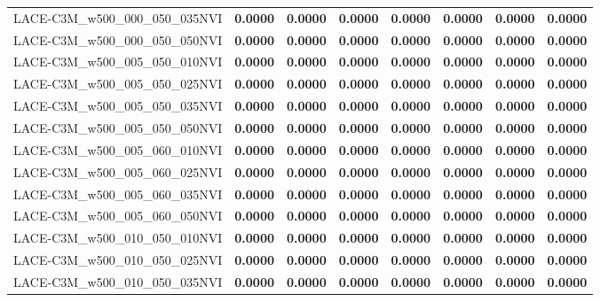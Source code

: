 \begin{table}
\begin{tabular}{lrrrrrrr}
LACE-C3M\_w500\_000\_050\_035NVI & \textbf{0.0000} & \textbf{0.0000} & \textbf{0.0000} & \textbf{0.0000} & \textbf{0.0000} & \textbf{0.0000} & \textbf{0.0000} \\
LACE-C3M\_w500\_000\_050\_050NVI & \textbf{0.0000} & \textbf{0.0000} & \textbf{0.0000} & \textbf{0.0000} & \textbf{0.0000} & \textbf{0.0000} & \textbf{0.0000} \\
LACE-C3M\_w500\_005\_050\_010NVI & \textbf{0.0000} & \textbf{0.0000} & \textbf{0.0000} & \textbf{0.0000} & \textbf{0.0000} & \textbf{0.0000} & \textbf{0.0000} \\
LACE-C3M\_w500\_005\_050\_025NVI & \textbf{0.0000} & \textbf{0.0000} & \textbf{0.0000} & \textbf{0.0000} & \textbf{0.0000} & \textbf{0.0000} & \textbf{0.0000} \\
LACE-C3M\_w500\_005\_050\_035NVI & \textbf{0.0000} & \textbf{0.0000} & \textbf{0.0000} & \textbf{0.0000} & \textbf{0.0000} & \textbf{0.0000} & \textbf{0.0000} \\
LACE-C3M\_w500\_005\_050\_050NVI & \textbf{0.0000} & \textbf{0.0000} & \textbf{0.0000} & \textbf{0.0000} & \textbf{0.0000} & \textbf{0.0000} & \textbf{0.0000} \\
LACE-C3M\_w500\_005\_060\_010NVI & \textbf{0.0000} & \textbf{0.0000} & \textbf{0.0000} & \textbf{0.0000} & \textbf{0.0000} & \textbf{0.0000} & \textbf{0.0000} \\
LACE-C3M\_w500\_005\_060\_025NVI & \textbf{0.0000} & \textbf{0.0000} & \textbf{0.0000} & \textbf{0.0000} & \textbf{0.0000} & \textbf{0.0000} & \textbf{0.0000} \\
LACE-C3M\_w500\_005\_060\_035NVI & \textbf{0.0000} & \textbf{0.0000} & \textbf{0.0000} & \textbf{0.0000} & \textbf{0.0000} & \textbf{0.0000} & \textbf{0.0000} \\
LACE-C3M\_w500\_005\_060\_050NVI & \textbf{0.0000} & \textbf{0.0000} & \textbf{0.0000} & \textbf{0.0000} & \textbf{0.0000} & \textbf{0.0000} & \textbf{0.0000} \\
LACE-C3M\_w500\_010\_050\_010NVI & \textbf{0.0000} & \textbf{0.0000} & \textbf{0.0000} & \textbf{0.0000} & \textbf{0.0000} & \textbf{0.0000} & \textbf{0.0000} \\
LACE-C3M\_w500\_010\_050\_025NVI & \textbf{0.0000} & \textbf{0.0000} & \textbf{0.0000} & \textbf{0.0000} & \textbf{0.0000} & \textbf{0.0000} & \textbf{0.0000} \\
LACE-C3M\_w500\_010\_050\_035NVI & \textbf{0.0000} & \textbf{0.0000} & \textbf{0.0000} & \textbf{0.0000} & \textbf{0.0000} & \textbf{0.0000} & \textbf{0.0000} \\

\end{tabular}
\end{table}
